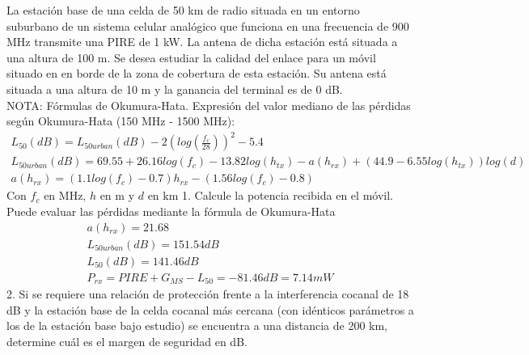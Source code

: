\begin{exercise}[7]
	La estación base de una celda de 50 km de radio situada en un entorno suburbano de un sistema celular analógico que funciona en una frecuencia de 900 MHz transmite una PIRE de 1 kW. La antena de dicha estación está situada a una altura de 100 m. Se desea estudiar la calidad del enlace para un móvil situado en en borde de la zona de cobertura de esta estación. Su antena está situada a una altura de 10 m y la ganancia del terminal es de 0 dB.\\ 
	NOTA: Fórmulas de Okumura-Hata. Expresión del valor mediano de las pérdidas según Okumura-Hata (150 MHz - 1500 MHz):
	\begin{gather*}
		L_{50}(dB)=L_{50urban}(dB)-2(log(\frac{f_c}{28}))^2-5.4\\
		L_{50urban}(dB)=69.55+26.16log(f_c)-13.82log(h_{tx})-a(h_{rx})+(44.9-6.55log(h_{tx}))log(d)\\
		a(h_{rx})=(1.1log(f_c)-0.7)h_{rx}-(1.56log(f_c)-0.8)
	\end{gather*}
	Con $f_c$ en MHz, $h$ en m y $d$ en km
	1. Calcule la potencia recibida en el móvil. Puede evaluar las pérdidas mediante la fórmula de Okumura-Hata\\
	\begin{gather*}
		a(h_{rx})=21.68\\
		L_{50urban}(dB)=151.54dB\\
		L_{50}(dB)=141.46dB\\
		P_{rx}=PIRE+G_{MS}-L_{50}=-81.46dB=7.14mW
	\end{gather*}
	2. Si se requiere una relación de protección frente a la interferencia cocanal de 18 dB y la estación base de la celda cocanal más cercana (con idénticos parámetros a los de la estación base bajo estudio) se encuentra a una distancia de 200 km, determine cuál es el margen de seguridad en dB.
\end{exercise}
